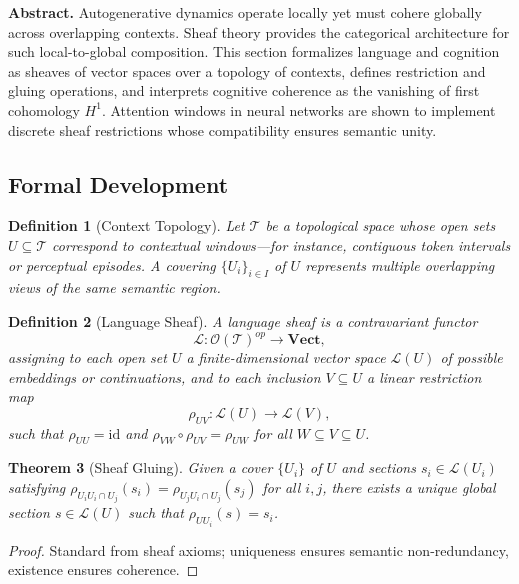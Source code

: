 \documentclass[12pt,a4paper,twoside,openright]{book}
\newtheorem{theorem}{Theorem}
\newtheorem{definition}[theorem]{Definition}
\begin{document}
\textbf{Abstract.}
Autogenerative dynamics operate locally yet must cohere globally across overlapping contexts.
Sheaf theory provides the categorical architecture for such local-to-global composition.  
This section formalizes language and cognition as sheaves of vector spaces over a topology of contexts, defines restriction and gluing operations, and interprets cognitive coherence as the vanishing of first cohomology \(H^1\).  
Attention windows in neural networks are shown to implement discrete sheaf restrictions whose compatibility ensures semantic unity.

\subsection*{Formal Development}

\begin{definition}[Context Topology]
Let \(\mathcal{T}\) be a topological space whose open sets \(U\subseteq\mathcal{T}\) correspond to contextual windows---for instance, contiguous token intervals or perceptual episodes.  
A covering \(\{U_i\}_{i\in I}\) of \(U\) represents multiple overlapping views of the same semantic region.
\end{definition}

\begin{definition}[Language Sheaf]
A \emph{language sheaf} is a contravariant functor
\[
\mathcal{L}\colon \mathcal{O}(\mathcal{T})^{op}\to \mathbf{Vect},
\]
assigning to each open set \(U\) a finite-dimensional vector space \(\mathcal{L}(U)\) of possible embeddings or continuations, and to each inclusion \(V\subseteq U\) a linear restriction map
\[
\rho_{UV}\colon \mathcal{L}(U)\to \mathcal{L}(V),
\]
such that
\(\rho_{UU}=\mathrm{id}\)
and
\(\rho_{VW}\circ\rho_{UV}=\rho_{UW}\)
for all \(W\subseteq V\subseteq U\).
\end{definition}

\begin{theorem}[Sheaf Gluing]
\label{thm:gluing}
Given a cover \(\{U_i\}\) of \(U\) and sections \(s_i\in\mathcal{L}(U_i)\) satisfying
\(
\rho_{U_iU_i\cap U_j}(s_i)
 = \rho_{U_jU_i\cap U_j}(s_j)
\)
for all \(i,j\),
there exists a unique global section \(s\in\mathcal{L}(U)\) such that
\(\rho_{UU_i}(s)=s_i\).
\end{theorem}

\begin{proof}
Standard from sheaf axioms; uniqueness ensures semantic non-redundancy, existence ensures coherence.
\end{proof}
\end{document}

